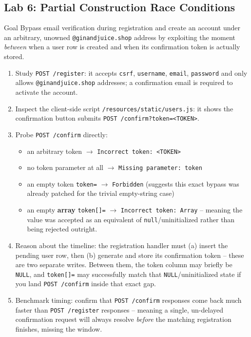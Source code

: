 \documentclass[11pt]{article}
\begin{document}
\subsection{Lab 6: Partial Construction Race Conditions}
\begin{labbox}{Goal}
Bypass email verification during registration and create an account under an arbitrary, unowned \texttt{@ginandjuice.shop} address by exploiting the moment \emph{between} when a user row is created and when its confirmation token is actually stored.
\end{labbox}
\begin{enumerate}[leftmargin=1.2em]
  \item Study \texttt{POST /register}: it accepts \texttt{csrf}, \texttt{username}, \texttt{email}, \texttt{password} and only allows \texttt{@ginandjuice.shop} addresses; a confirmation email is required to activate the account.
  \item Inspect the client-side script \texttt{/resources/static/users.js}: it shows the confirmation button submits \texttt{POST /confirm?token=<TOKEN>}.
  \item Probe \texttt{POST /confirm} directly:
    \begin{itemize}
      \item an arbitrary token $\rightarrow$ \texttt{Incorrect token: <TOKEN>}
      \item no token parameter at all $\rightarrow$ \texttt{Missing parameter: token}
      \item an empty token \texttt{token=} $\rightarrow$ \texttt{Forbidden} (suggests this exact bypass was already patched for the trivial empty-string case)
      \item an empty \textbf{array} \texttt{token[]=} $\rightarrow$ \texttt{Incorrect token: Array} -- meaning the value was accepted as an equivalent of \texttt{null}/uninitialized rather than being rejected outright.
    \end{itemize}
  \item Reason about the timeline: the registration handler must (a) insert the pending user row, then (b) generate and store its confirmation token -- these are two separate writes. Between them, the token column may briefly be \texttt{NULL}, and \texttt{token[]=} may successfully match that \texttt{NULL}/uninitialized state if you land \texttt{POST /confirm} inside that exact gap.
  \item Benchmark timing: confirm that \texttt{POST /confirm} responses come back much faster than \texttt{POST /register} responses -- meaning a single, un-delayed confirmation request will always resolve \emph{before} the matching registration finishes, missing the window.

\end{enumerate}
\end{document}
